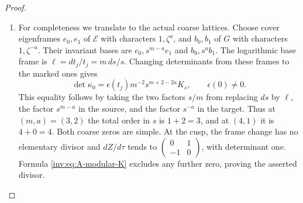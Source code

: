 \begin{proof}
\begin{enumerate}[label=\arabic*.,leftmargin=*]
\item For completeness we translate to the actual coarse lattices.  Choose
cover eigenframes $e_0,e_1$ of $\mathcal E$ with characters
$1,\zeta^a$, and $b_0,b_1$ of $G$ with characters
$1,\zeta^{-a}$.  Their invariant bases are
$e_0,s^{m-a}e_1$ and $b_0,s^ab_1$.  The logarithmic base frame is
$\ell=dt_j/t_j=m\,ds/s$.  Changing determinants from these frames
to the marked ones gives
\[
\det\kappa_0=\epsilon(t_j)m^{-2}s^{m+2-2a}K_s,
\qquad \epsilon(0)\ne0.
\]
This equality follows by taking the two factors $s/m$ from replacing
$ds$ by $\ell$, the factor $s^{m-a}$ in the source, and the factor
$s^{-a}$ in the target.  Thus at $(m,a)=(3,2)$ the total order in
$s$ is $1+2=3$, and at $(4,1)$ it is $4+0=4$.
Both coarse zeros are simple.  At the cusp, the frame change has
no elementary divisor and $dZ/d\tau$ tends to
$\left(\begin{smallmatrix}0&1\\-1&0\end{smallmatrix}\right)$,
with determinant one.  Formula \eqref{inv:eq:A-modular-K} excludes any
further zero, proving the asserted divisor.
\end{enumerate}
\end{proof}

